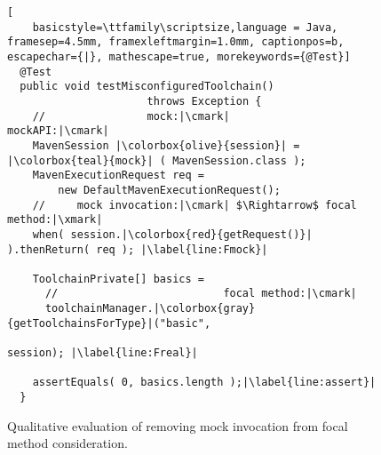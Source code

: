 \begin{figure}[h]
	\begin{lstlisting}[
	basicstyle=\ttfamily\scriptsize,language = Java, framesep=4.5mm, framexleftmargin=1.0mm, captionpos=b, escapechar={|}, mathescape=true, morekeywords={@Test}]
  @Test
  public void testMisconfiguredToolchain() 
                      throws Exception {
    //                mock:|\cmark|         mockAPI:|\cmark|
    MavenSession |\colorbox{olive}{session}| = |\colorbox{teal}{mock}| ( MavenSession.class );
    MavenExecutionRequest req =
        new DefaultMavenExecutionRequest();
    //     mock invocation:|\cmark| $\Rightarrow$ focal method:|\xmark|
    when( session.|\colorbox{red}{getRequest()}| ).thenReturn( req ); |\label{line:Fmock}|

    ToolchainPrivate[] basics =
      //                          focal method:|\cmark|
      toolchainManager.|\colorbox{gray}{getToolchainsForType}|("basic", 
                                                           session); |\label{line:Freal}|

    assertEquals( 0, basics.length );|\label{line:assert}|
  }
  \end{lstlisting}

  \caption{Qualitative evaluation of removing mock invocation from focal method consideration.}
  \label{fig:mockExampleEvaluation}
\end{figure}
